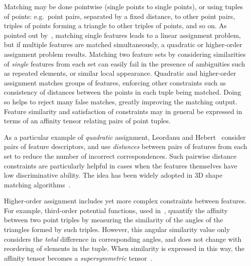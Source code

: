 Matching may be done pointwise (single points to single points), or using tuples of points:
e.g.\ point pairs, separated by a fixed distance, to other point pairs,
triples of points forming a triangle to other triples of points, and so on.
As pointed out by~\cite{Conte04}, matching single features leads to
a linear assignment problem, but if multiple features are matched simultaneously,
a quadratic or higher-order assignment problem results.
Matching two feature sets by considering similarities of \emph{single} features from each set can easily fail in the presence of ambiguities such as repeated elements,
or similar local appearance.
Quadratic and higher-order assignment matches groups of features,
enforcing other constraints such as consistency of distances between the points in each tuple being matched.
Doing so helps to reject many false matches, greatly improving the matching output.
Feature similarity and satisfaction of constraints may in general be expressed in terms of an affinity tensor relating pairs of point tuples.

As a particular example of \emph{quadratic} assignment, Leordanu and Hebert~\cite{Leordeanu05} consider pairs of feature descriptors,
and use \emph{distances} between pairs of features from each set to reduce the number of incorrect correspondences.
Such pairwise distance constraints are particularly helpful in cases when the features themselves have low discriminative ability.
The idea has been widely adopted in 3D shape matching algorithms~\cite{Tevs09,Ovsjanikov10,Tevs11,Kim11,SahilliogluY11,Windheuser11}.

Higher-order assignment  includes yet more complex constraints between features.
For example, third-order potential functions, used in~\cite{Duchenne09,Duchenne2011,Zeng10,Chertok10,Aiping10},
quantify the affinity between two point triples by measuring the similarity of the angles of the triangles formed by such triples.
However, this angular similarity value only considers the \emph{total} difference in corresponding angles, and does not change with reordering of elements in the tuple.
When similarity is expressed in this way, the affinity tensor becomes a \emph{supersymmetric} tensor~\cite{Kofidis02}.

